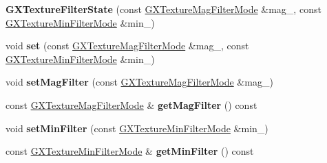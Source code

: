 \begin{DoxyCompactItemize}
\item 
{\bfseries G\+X\+Texture\+Filter\+State} (const \hyperlink{class_magnum_1_1_g_x_texture_mag_filter_mode}{G\+X\+Texture\+Mag\+Filter\+Mode} \&mag\+\_\+, const \hyperlink{class_magnum_1_1_g_x_texture_min_filter_mode}{G\+X\+Texture\+Min\+Filter\+Mode} \&min\+\_\+)\hypertarget{class_magnum_1_1_g_x_texture_filter_state_a4638bdd3fe6d2c959250e1834852b9d8}{}\label{class_magnum_1_1_g_x_texture_filter_state_a4638bdd3fe6d2c959250e1834852b9d8}

\item 
void {\bfseries set} (const \hyperlink{class_magnum_1_1_g_x_texture_mag_filter_mode}{G\+X\+Texture\+Mag\+Filter\+Mode} \&mag\+\_\+, const \hyperlink{class_magnum_1_1_g_x_texture_min_filter_mode}{G\+X\+Texture\+Min\+Filter\+Mode} \&min\+\_\+)\hypertarget{class_magnum_1_1_g_x_texture_filter_state_ab67ff8c05946d40a80aa4cd3330c3d5d}{}\label{class_magnum_1_1_g_x_texture_filter_state_ab67ff8c05946d40a80aa4cd3330c3d5d}

\item 
void {\bfseries set\+Mag\+Filter} (const \hyperlink{class_magnum_1_1_g_x_texture_mag_filter_mode}{G\+X\+Texture\+Mag\+Filter\+Mode} \&mag\+\_\+)\hypertarget{class_magnum_1_1_g_x_texture_filter_state_a04fc4a2c39df862db34f16d89bfa2120}{}\label{class_magnum_1_1_g_x_texture_filter_state_a04fc4a2c39df862db34f16d89bfa2120}

\item 
const \hyperlink{class_magnum_1_1_g_x_texture_mag_filter_mode}{G\+X\+Texture\+Mag\+Filter\+Mode} \& {\bfseries get\+Mag\+Filter} () const \hypertarget{class_magnum_1_1_g_x_texture_filter_state_a55894ddfe4b22c05f395c166920839ac}{}\label{class_magnum_1_1_g_x_texture_filter_state_a55894ddfe4b22c05f395c166920839ac}

\item 
void {\bfseries set\+Min\+Filter} (const \hyperlink{class_magnum_1_1_g_x_texture_min_filter_mode}{G\+X\+Texture\+Min\+Filter\+Mode} \&min\+\_\+)\hypertarget{class_magnum_1_1_g_x_texture_filter_state_a7b829e8c55805f4186e7496cdafc5040}{}\label{class_magnum_1_1_g_x_texture_filter_state_a7b829e8c55805f4186e7496cdafc5040}

\item 
const \hyperlink{class_magnum_1_1_g_x_texture_min_filter_mode}{G\+X\+Texture\+Min\+Filter\+Mode} \& {\bfseries get\+Min\+Filter} () const \hypertarget{class_magnum_1_1_g_x_texture_filter_state_a61d7ac8beb0d7bac98fe277b979b04de}{}\label{class_magnum_1_1_g_x_texture_filter_state_a61d7ac8beb0d7bac98fe277b979b04de}

\end{DoxyCompactItemize}


